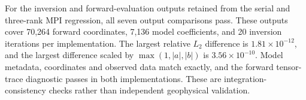 ﻿\documentclass[11pt,a4paper]{article}
\begin{document}
For the inversion and forward-evaluation outputs retained from the serial and three-rank MPI regression, all seven output comparisons pass. These outputs cover 70,264 forward coordinates, 7,136 model coefficients, and 20 inversion iterations per implementation. The largest relative $L_2$ difference is $1.81\times10^{-12}$, and the largest difference scaled by $\max(1,|a|,|b|)$ is $3.56\times10^{-10}$. Model metadata, coordinates and observed data match exactly, and the forward tensor-trace diagnostic passes in both implementations. These are integration-consistency checks rather than independent geophysical validation.

\begingroup
\small
{}
\setlength{\bibsep}{1.2pt}
\setlength{\bibhang}{1.5em}


\endgroup
\end{document}
